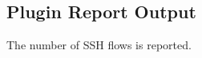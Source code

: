 \documentclass[documentation]{subfiles}
\begin{document}
\subsection{Plugin Report Output}
The number of SSH flows is reported.

\end{document}
